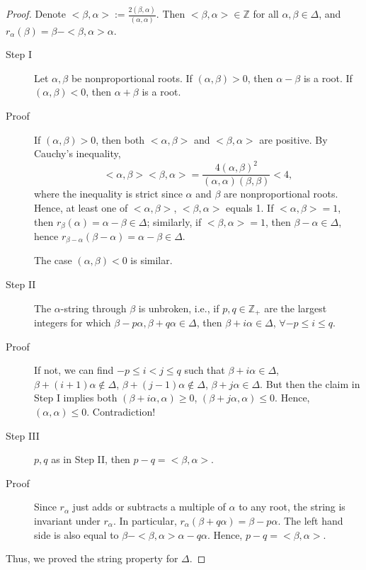 \documentclass[10pt,twoside]{article}
\newcommand{\Zz}{\mathbb Z}
\theoremstyle{definition}
\theoremstyle{remark}
\begin{document}
\begin{proof}

Denote $<\beta, \alpha> := \frac{2(\beta, \alpha)}{(\alpha,\alpha)}$.  Then $<\beta, \alpha>\in \Zz$ for all $\alpha, \beta \in \Delta$, and $r_{\alpha}(\beta)=\beta-<\beta,\alpha>\alpha$.

\renewcommand{\descriptionlabel}[1]{\hspace\labelsep #1:}

\begin{description}

\item[Step I]  Let $\alpha, \beta$ be nonproportional roots.  If $(\alpha, \beta)>0$, then $\alpha-\beta$ is a root.  If $(\alpha,\beta)<0$, then $\alpha+\beta$ is a root.

\item[Proof]
If  $(\alpha, \beta)>0$, then both $<\alpha, \beta>$ and $<\beta,\alpha>$ are positive.  By Cauchy's inequality, $$<\alpha, \beta><\beta,\alpha>=\frac{4(\alpha, \beta)^2}{(\alpha,\alpha)(\beta, \beta)}< 4, $$
where the inequality is strict since  $\alpha$ and $\beta$ are nonproportional roots.  Hence, at least one of $<\alpha,\beta>$, $<\beta,\alpha>$ equals 1.  If $<\alpha,\beta>=1$, then $r_\beta(\alpha)=\alpha-\beta\in \Delta$; similarly, if $<\beta, \alpha>=1$, then $\beta-\alpha\in \Delta$, hence $r_{\beta-\alpha}(\beta-\alpha)=\alpha-\beta \in \Delta$.

The case  $(\alpha, \beta)<0$ is similar.

\item[Step II]  The $\alpha$-string through $\beta$ is unbroken, i.e., if $p,q\in \Zz_+$ are the largest integers for which $\beta-p\alpha, \beta+q\alpha \in \Delta$, then $\beta+i\alpha\in \Delta$, $\forall -p\leq i \leq q$.

\item[Proof]
If not, we can find $-p \leq i <j \leq q$ such that $\beta+i\alpha\in \Delta$, $\beta+(i+1)\alpha\notin \Delta$, $\beta+(j-1)\alpha\notin \Delta$, $\beta+j\alpha\in \Delta$.  But then the claim in Step I implies both $(\beta+i\alpha, \alpha)\geq 0$, $(\beta+j\alpha, \alpha)\leq 0$.  Hence, $(\alpha, \alpha) \leq 0$.  Contradiction!

\item[Step III]  $p, q$ as in Step II, then $p-q=<\beta,\alpha>$.

\item[Proof]
Since $r_\alpha$ just adds or subtracts a multiple of $\alpha$ to any root, the string is invariant under $r_\alpha$.  In particular, $r_\alpha(\beta+q\alpha)=\beta-p\alpha$.  The left hand side is also equal to $\beta-<\beta,\alpha>\alpha-q\alpha$.  Hence, $p-q=<\beta,\alpha>$.

\end{description}
Thus, we proved the string property for $\Delta$.
\end{proof}
\end{document}
